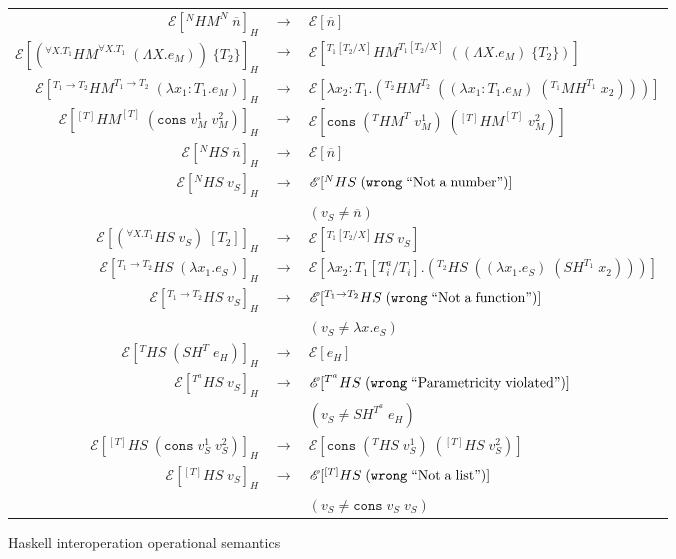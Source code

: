 \begin{figure}
\onehalfspacing
\begin{center}
\begin{tabular}{rcl}
$\mathscr{E}[^{N}HM^{N}\;\overline{n}]_{H}$ & $\rightarrow$ & $\mathscr{E}[\overline{n}]$ \\
$\mathscr{E}[(^{\forall X.T_{1}}HM^{\forall X.T_{1}}\;(\Lambda X.e_{M}))\;\lbrace T_{2}\rbrace]_{H}$ & $\rightarrow$ & $\mathscr{E}[^{T_{1}[T_{2}/X]}HM^{T_{1}[T_{2}/X]}\;((\Lambda X.e_{M})\;\lbrace T_{2}\rbrace)]$ \\
$\mathscr{E}[^{T_{1}\rightarrow T_{2}}HM^{T_{1}\rightarrow T_{2}}\;(\lambda x_{1}:T_{1}.e_{M})]_{H}$ & $\rightarrow$ & $\mathscr{E}[\lambda x_{2}:T_{1}.(^{T_{2}}HM^{T_{2}}\;((\lambda x_{1}:T_{1}.e_{M})\;(^{T_{1}}MH^{T_{1}}\;x_{2})))]$ \\
$\mathscr{E}[^{[T]}HM^{[T]}\;(\mathtt{cons}\;v_{M}^{1}\;v_{M}^{2})]_{H}$ & $\rightarrow$ & $\mathscr{E}[\mathtt{cons}\;(^{T}HM^{T}\;v_{M}^{1})\;(^{[T]}HM^{[T]}\;v_{M}^{2})]$ \\
$\mathscr{E}[^{N}HS\;\overline{n}]_{H}$ & $\rightarrow$ & $\mathscr{E}[\overline{n}]$ \\
$\mathscr{E}[^{N}HS\;v_{S}]_{H}$ & $\rightarrow$ & $\mathscr{E}[^{N}HS\;(\mathtt{wrong}\;\mathrm{``Not\;a\;number"})]$ \\
&& $(v_{S}\neq\overline{n})$ \\
$\mathscr{E}[(^{\forall X.T_{1}}HS\;v_{S})\;[T_{2}]]_{H}$ & $\rightarrow$ & $\mathscr{E}[^{T_{1}[T_{2}/X]}HS\;v_{S}]$ \\
$\mathscr{E}[^{T_{1}\rightarrow T_{2}}HS\;(\lambda x_{1}.e_{S})]_{H}$ & $\rightarrow$ & $\mathscr{E}[\lambda x_{2}:T_{1}[T^{a}_{i}/T_{i}].(^{T_{2}}HS\;((\lambda x_{1}.e_{S})\;(SH^{T_{1}}\;x_{2})))]$ \\
$\mathscr{E}[^{T_{1}\rightarrow T_{2}}HS\;v_{S}]_{H}$ & $\rightarrow$ & $\mathscr{E}[^{T_{1}\rightarrow T_{2}}HS\;(\mathtt{wrong}\;\mathrm{``Not\;a\;function"})]$ \\
&& $(v_{S}\neq\lambda x.e_{S})$ \\
$\mathscr{E}[^{T}HS\;(SH^{T}\;e_{H})]_{H}$ & $\rightarrow$ & $\mathscr{E}[e_{H}]$ \\
$\mathscr{E}[^{T^{a}}HS\;v_{S}]_{H}$ & $\rightarrow$ & $\mathscr{E}[^{T^{a}}HS\;(\mathtt{wrong}\;\mathrm{``Parametricity\;violated"})]$ \\
&& $(v_{S}\neq SH^{T^{a}}\;e_{H})$ \\
$\mathscr{E}[^{[T]}HS\;(\mathtt{cons}\;v_{S}^{1}\;v_{S}^{2})]_{H}$ & $\rightarrow$ & $\mathscr{E}[\mathtt{cons}\;(^{T}HS\;v_{S}^{1})\;(^{[T]}HS\;v_{S}^{2})]$ \\
$\mathscr{E}[^{[T]}HS\;v_{S}]_{H}$ & $\rightarrow$ & $\mathscr{E}[^{[T]}HS\;(\mathtt{wrong}\;\mathrm{``Not\;a\;list"})]$ \\
&& $(v_{S}\neq\mathtt{cons}\;v_{S}\;v_{S})$
\end{tabular}
\end{center}
\caption{Haskell interoperation operational semantics}
\label{fig:hios}
\end{figure}